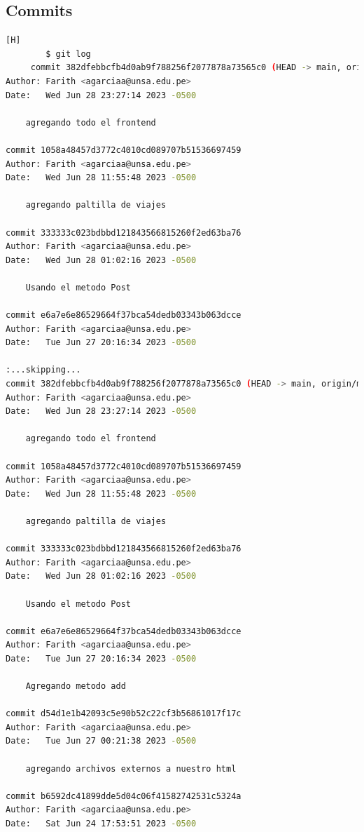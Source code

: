 \documentclass{article}
\begin{document}
 \subsection{Commits}
     \begin{lstlisting}[language=bash,caption={Todos los commit hechos para el laboratorio 6}][H]
    	$ git log
     commit 382dfebbcfb4d0ab9f788256f2077878a73565c0 (HEAD -> main, origin/main, origin/HEAD)
Author: Farith <agarciaa@unsa.edu.pe>
Date:   Wed Jun 28 23:27:14 2023 -0500

    agregando todo el frontend

commit 1058a48457d3772c4010cd089707b51536697459
Author: Farith <agarciaa@unsa.edu.pe>
Date:   Wed Jun 28 11:55:48 2023 -0500

    agregando paltilla de viajes

commit 333333c023bdbbd121843566815260f2ed63ba76
Author: Farith <agarciaa@unsa.edu.pe>
Date:   Wed Jun 28 01:02:16 2023 -0500

    Usando el metodo Post

commit e6a7e6e86529664f37bca54dedb03343b063dcce
Author: Farith <agarciaa@unsa.edu.pe>
Date:   Tue Jun 27 20:16:34 2023 -0500

:...skipping...
commit 382dfebbcfb4d0ab9f788256f2077878a73565c0 (HEAD -> main, origin/main, origin/HEAD)
Author: Farith <agarciaa@unsa.edu.pe>
Date:   Wed Jun 28 23:27:14 2023 -0500

    agregando todo el frontend

commit 1058a48457d3772c4010cd089707b51536697459
Author: Farith <agarciaa@unsa.edu.pe>
Date:   Wed Jun 28 11:55:48 2023 -0500

    agregando paltilla de viajes

commit 333333c023bdbbd121843566815260f2ed63ba76
Author: Farith <agarciaa@unsa.edu.pe>
Date:   Wed Jun 28 01:02:16 2023 -0500

    Usando el metodo Post

commit e6a7e6e86529664f37bca54dedb03343b063dcce
Author: Farith <agarciaa@unsa.edu.pe>
Date:   Tue Jun 27 20:16:34 2023 -0500

    Agregando metodo add

commit d54d1e1b42093c5e90b52c22cf3b56861017f17c
Author: Farith <agarciaa@unsa.edu.pe>
Date:   Tue Jun 27 00:21:38 2023 -0500

    agregando archivos externos a nuestro html

commit b6592dc41899dde5d04c06f41582742531c5324a
Author: Farith <agarciaa@unsa.edu.pe>
Date:   Sat Jun 24 17:53:51 2023 -0500


\end{lstlisting}
\end{document}
